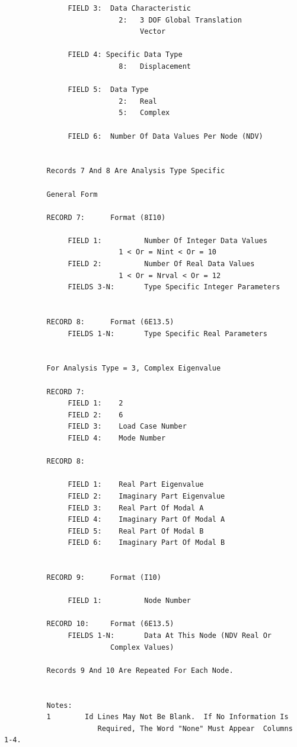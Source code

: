 \documentclass[10pt,openany,twoside]{book}
\numberwithin{equation}{section}   %
\begin{document}
\begin{verbatim}
               FIELD 3:  Data Characteristic
                           2:   3 DOF Global Translation
                                Vector

               FIELD 4: Specific Data Type
                           8:   Displacement

               FIELD 5:  Data Type
                           2:   Real
                           5:   Complex

               FIELD 6:  Number Of Data Values Per Node (NDV)


          Records 7 And 8 Are Analysis Type Specific

          General Form

          RECORD 7:      Format (8I10)

               FIELD 1:          Number Of Integer Data Values
                           1 < Or = Nint < Or = 10
               FIELD 2:          Number Of Real Data Values
                           1 < Or = Nrval < Or = 12
               FIELDS 3-N:       Type Specific Integer Parameters


          RECORD 8:      Format (6E13.5)
               FIELDS 1-N:       Type Specific Real Parameters


          For Analysis Type = 3, Complex Eigenvalue

          RECORD 7:
               FIELD 1:    2
               FIELD 2:    6
               FIELD 3:    Load Case Number
               FIELD 4:    Mode Number

          RECORD 8:

               FIELD 1:    Real Part Eigenvalue
               FIELD 2:    Imaginary Part Eigenvalue
               FIELD 3:    Real Part Of Modal A
               FIELD 4:    Imaginary Part Of Modal A
               FIELD 5:    Real Part Of Modal B
               FIELD 6:    Imaginary Part Of Modal B


          RECORD 9:      Format (I10)

               FIELD 1:          Node Number

          RECORD 10:     Format (6E13.5)
               FIELDS 1-N:       Data At This Node (NDV Real Or
                         Complex Values)

          Records 9 And 10 Are Repeated For Each Node.


          Notes:
          1        Id Lines May Not Be Blank.  If No Information Is
                      Required, The Word "None" Must Appear  Columns 1-4.


\end{verbatim}
\end{document}

